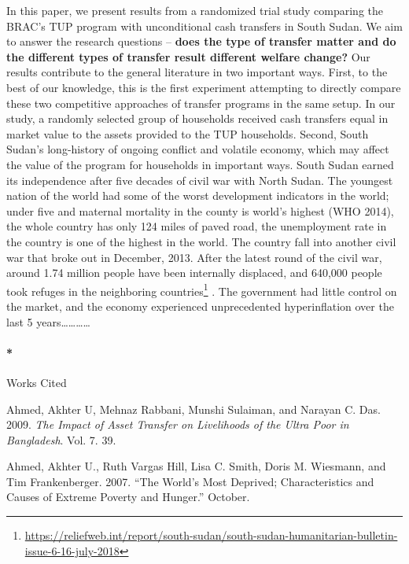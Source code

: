 \documentclass[]{article}
\let\oldparagraph\paragraph
\renewcommand{\paragraph}[1]{\oldparagraph{#1}\mbox{}}
\let\rmarkdownfootnote\footnote%
\def\footnote{\protect\rmarkdownfootnote}
\begin{document}
In this paper, we present results from a randomized trial study
comparing the BRAC's TUP program with unconditional cash transfers in
South Sudan. We aim to answer the research questions -- \textbf{does the
type of transfer matter and do the different types of transfer result
different welfare change?} Our results contribute to the general
literature in two important ways. First, to the best of our knowledge,
this is the first experiment attempting to directly compare these two
competitive approaches of transfer programs in the same setup. In our
study, a randomly selected group of households received cash transfers
equal in market value to the assets provided to the TUP households.
Second, South Sudan's long-history of ongoing conflict and volatile
economy, which may affect the value of the program for households in
important ways. South Sudan earned its independence after five decades
of civil war with North Sudan. The youngest nation of the world had some
of the worst development indicators in the world; under five and
maternal mortality in the county is world's highest (WHO 2014), the
whole country has only 124 miles of paved road, the unemployment rate in
the country is one of the highest in the world. The country fall into
another civil war that broke out in December, 2013. After the latest
round of the civil war, around 1.74 million people have been internally
displaced, and 640,000 people took refuges in the neighboring
countries\footnote{\url{https://reliefweb.int/report/south-sudan/south-sudan-humanitarian-bulletin-issue-6-16-july-2018}}
. The government had little control on the market, and the economy
experienced unprecedented hyperinflation over the last 5
years\ldots{}\ldots{}\ldots{}\ldots{}

\paragraph*{Works Cited}\label{works-cited}

\hypertarget{refs}{}
\hypertarget{ref-Ahmed2009}{}
Ahmed, Akhter U, Mehnaz Rabbani, Munshi Sulaiman, and Narayan C. Das.
2009. \emph{The Impact of Asset Transfer on Livelihoods of the Ultra
Poor in Bangladesh}. Vol. 7. 39.

\hypertarget{ref-Ahmed2007}{}
Ahmed, Akhter U., Ruth Vargas Hill, Lisa C. Smith, Doris M. Wiesmann,
and Tim Frankenberger. 2007. ``The World's Most Deprived;
Characteristics and Causes of Extreme Poverty and Hunger.'' October.
\end{document}
